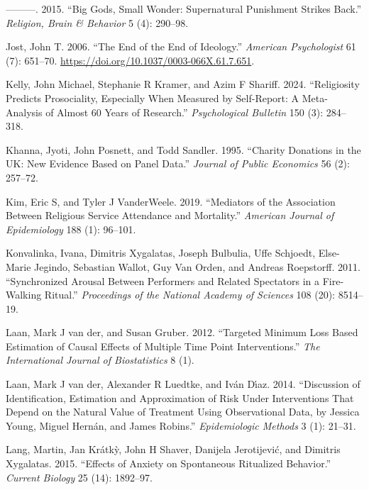 \documentclass[
  single column]{article}
\newlength{\cslhangindent}
\newenvironment{CSLReferences}[2] %
 {\begin{list}{}{%
  \setlength{\itemindent}{0pt}
  \setlength{\leftmargin}{0pt}
  \setlength{\parsep}{0pt}
  \ifodd #1
   \setlength{\leftmargin}{\cslhangindent}
   \setlength{\itemindent}{-1\cslhangindent}
  \fi
  \setlength{\itemsep}{#2\baselineskip}}}
 {\end{list}}
\begin{document}
\begin{CSLReferences}{1}{0}
---------. 2015. {``Big Gods, Small Wonder: Supernatural Punishment
Strikes Back.''} \emph{Religion, Brain \& Behavior} 5 (4): 290--98.

Jost, John T. 2006. {``The End of the End of Ideology.''} \emph{American
Psychologist} 61 (7): 651--70.
\url{https://doi.org/10.1037/0003-066X.61.7.651}.

Kelly, John Michael, Stephanie R Kramer, and Azim F Shariff. 2024.
{``Religiosity Predicts Prosociality, Especially When Measured by
Self-Report: A Meta-Analysis of Almost 60 Years of Research.''}
\emph{Psychological Bulletin} 150 (3): 284--318.

Khanna, Jyoti, John Posnett, and Todd Sandler. 1995. {``Charity
Donations in the UK: New Evidence Based on Panel Data.''} \emph{Journal
of Public Economics} 56 (2): 257--72.

Kim, Eric S, and Tyler J VanderWeele. 2019. {``Mediators of the
Association Between Religious Service Attendance and Mortality.''}
\emph{American Journal of Epidemiology} 188 (1): 96--101.

Konvalinka, Ivana, Dimitris Xygalatas, Joseph Bulbulia, Uffe Schjoedt,
Else-Marie Jegindo, Sebastian Wallot, Guy Van Orden, and Andreas
Roepstorff. 2011. {``Synchronized Arousal Between Performers and Related
Spectators in a Fire-Walking Ritual.''} \emph{Proceedings of the
National Academy of Sciences} 108 (20): 8514--19.

Laan, Mark J van der, and Susan Gruber. 2012. {``Targeted Minimum Loss
Based Estimation of Causal Effects of Multiple Time Point
Interventions.''} \emph{The International Journal of Biostatistics} 8
(1).

Laan, Mark J van der, Alexander R Luedtke, and Iván Dı́az. 2014.
{``Discussion of Identification, Estimation and Approximation of Risk
Under Interventions That Depend on the Natural Value of Treatment Using
Observational Data, by {J}essica {Y}oung, {M}iguel {H}ern{á}n, and
{J}ames {R}obins.''} \emph{Epidemiologic Methods} 3 (1): 21--31.

Lang, Martin, Jan Krátkỳ, John H Shaver, Danijela Jerotijević, and
Dimitris Xygalatas. 2015. {``Effects of Anxiety on Spontaneous
Ritualized Behavior.''} \emph{Current Biology} 25 (14): 1892--97.


\end{CSLReferences}
\end{document}

